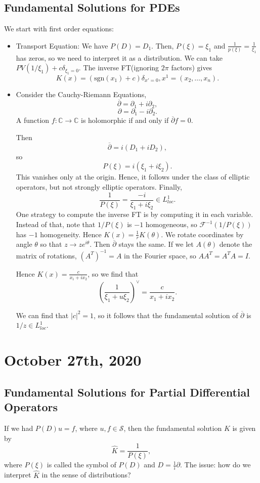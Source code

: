 \documentclass[11pt]{scrartcl}
\newcommand{\C}{\mathbb C}
\renewcommand{\hat}{\widehat}
\begin{document}
\subsection{Fundamental Solutions for PDEs}
We start with first order equations: 
\begin{itemize}
\item Transport Equation: We have $P(D) = D_1$.  Then, $P(\xi) =\xi_1$ and 
$\frac{1}{p(\xi)} = \frac{1}{\xi_1}$ has zeros, so we need to interpret it as a distribution.  We can take $PV(1/\xi_1) + c\delta_{\xi_1 = 0}.$  The inverse FT(ignoring $2\pi$ factors) gives 
$$K(x) =(\text{sgn}(x_1) + c)\delta_{x' = 0}, x^1 = (x_2,\dots, x_n).$$
\item Consider the Cauchy-Riemann Equations,
$$\overline{\partial} = \partial_1 + i\partial_2,$$
$$\partial = \partial_1 - i\partial_2.$$
A function $f: \C \to \C$ is holomorphic if and only if $\overline{\partial} f = 0$.

Then 
$$\overline{\partial} = i(D_1 + iD_2),$$
so 
$$P(\xi) = i(\xi_1 + i\xi_2).$$
This vanishes only at the origin.  Hence, it follows under the class of elliptic operators, but not strongly elliptic operators.
Finally,
$$\frac{1}{P(\xi)} = \frac{-i}{\xi_1 + i\xi_2} \in L_{loc}^1.$$
One strategy to compute the inverse FT is by computing it in each variable.  Instead of that, note that $1/P(\xi)$ is $-1$ homogeneous, so $\mathcal F^{-1}(1/P(\xi))$ has $-1$ homogeneity.  
Hence $K(x) = \frac{1}{r}K(\theta)$.  We rotate coordinates by angle $\theta$ so that $z \to ze^{i\theta}$.  Then $\overline{\partial}$ stays the same.  If we let $A(\theta)$ denote the matrix of rotations, $(A^T)^{-1} = A$ in the Fourier space, so $AA^T = A^TA = I$.

Hence $K(x) = \frac{c}{x_1 + ix_2}$, so we find that 
$$\left (\frac{1}{\xi_1 + u\xi_2}\right )^\vee = \frac{c}{x_1 + ix_2}.$$

We can find that $|c|^2 = 1$, so it follows that the fundamental solution of $\overline{\partial}$ is $1/z \in L_{loc}^1$.  
\end{itemize}
\pagebreak
\section{October 27th, 2020}
\subsection{Fundamental Solutions for Partial Differential Operators}
If we had $P(D)u = f$, where $u, f \in \mathcal S$, then the fundamental solution $K$ is given by 
$$\hat{K} = \frac{1}{P(\xi)},$$
where $P(\xi)$ is called the symbol of $P(D)$ and $D = \frac{1}{i}\partial$.  The issue: how do we interpret $\hat{K}$ in the sense of distributions?
\end{document}
